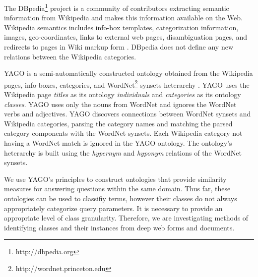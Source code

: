 
The DBpedia\footnote{http://dbpedia.org} project is a community of contributors extracting semantic information from Wikipedia and makes this information available on the Web. Wikipedia semantics includes info-box templates, categorization information,  images, geo-coordinates, links to external web pages, disambiguation pages, and redirects to pages in Wiki markup form \cite{Bizer2009}.  DBpedia does not define any new relations between the Wikipedia categories.  


YAGO is a semi-automatically constructed ontology obtained from the Wikipedia pages, info-boxes, categories, and WordNet\footnote{http://wordnet.princeton.edu} synsets heterarchy \cite{Suchanek2009phd}. YAGO uses the Wikipedia page \emph{titles} as its ontology \emph{individuals} and \emph{categories} as its ontology \emph{classes}. YAGO uses only the nouns from WordNet and ignores the WordNet verbs and adjectives.  YAGO discovers connections between WordNet synsets and Wikipedia categories, parsing the category names and matching the parsed category components with the WordNet synsets. Each Wikipedia category not having a WordNet match is ignored in the YAGO ontology.  The ontology's heterarchy is built using the \textit{hypernym} and \textit{hyponym} relations of the WordNet synsets.  

We use YAGO's principles to construct ontologies that provide similarity measures for answering questions within the same domain.  Thus far, these ontologies can be used to classifiy terms, however their classes do not always appropriately categorize query parameters.  It is necessary to provide an appropriate level of class granularity.  Therefore, we are investigating  methods of identifying classes and their instances from deep web forms and documents.


